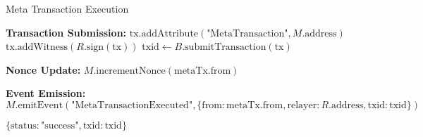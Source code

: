 \begin{tcolorbox}
\begin{protocol}{Meta Transaction Execution}
\begin{algorithmic}[1]
\State \textbf{Transaction Submission:}
\State $\text{tx}.\text{addAttribute}(\text{"MetaTransaction"}, M.\text{address})$
\State $\text{tx}.\text{addWitness}(R.\text{sign}(\text{tx}))$
\State $\text{txid} \gets B.\text{submitTransaction}(\text{tx})$

\State \textbf{Nonce Update:}
\State $M.\text{incrementNonce}(\text{metaTx}.\text{from})$

\State \textbf{Event Emission:}
\State $M.\text{emitEvent}(\text{"MetaTransactionExecuted"}, \{\text{from}: \text{metaTx}.\text{from}, \text{relayer}: R.\text{address}, \text{txid}: \text{txid}\})$

\State \Return $\{\text{status}: \text{"success"}, \text{txid}: \text{txid}\}$
\end{algorithmic}
\end{protocol}
\end{tcolorbox}
